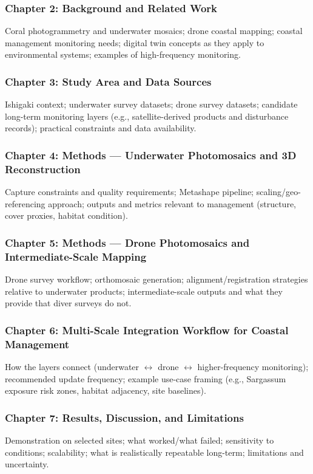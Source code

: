 \documentclass[a4paper,12pt]{article}
\begin{document}
\subsubsection*{Chapter 2: Background and Related Work}
Coral photogrammetry and underwater mosaics; drone coastal mapping; coastal management monitoring needs; digital twin concepts as they apply to environmental systems; examples of high-frequency monitoring.

\subsubsection*{Chapter 3: Study Area and Data Sources}
Ishigaki context; underwater survey datasets; drone survey datasets; candidate long-term monitoring layers (e.g., satellite-derived products and disturbance records); practical constraints and data availability.

\subsubsection*{Chapter 4: Methods — Underwater Photomosaics and 3D Reconstruction}
Capture constraints and quality requirements; Metashape pipeline; scaling/geo-referencing approach; outputs and metrics relevant to management (structure, cover proxies, habitat condition).

\subsubsection*{Chapter 5: Methods — Drone Photomosaics and Intermediate-Scale Mapping}
Drone survey workflow; orthomosaic generation; alignment/registration strategies relative to underwater products; intermediate-scale outputs and what they provide that diver surveys do not.

\subsubsection*{Chapter 6: Multi-Scale Integration Workflow for Coastal Management}
How the layers connect (underwater $\leftrightarrow$ drone $\leftrightarrow$ higher-frequency monitoring); recommended update frequency; example use-case framing (e.g., Sargassum exposure risk zones, habitat adjacency, site baselines).

\subsubsection*{Chapter 7: Results, Discussion, and Limitations}
Demonstration on selected sites; what worked/what failed; sensitivity to conditions; scalability; what is realistically repeatable long-term; limitations and uncertainty.
\end{document}
